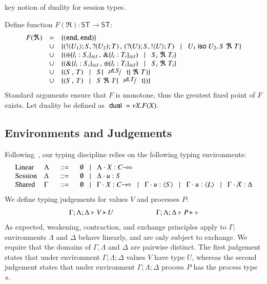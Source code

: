 key notion of duality for session types.
%
\begin{definition}[Duality]\rm
	Define function $F(\Re): \mathsf{ST} \longrightarrow \mathsf{ST}$:
	\[
		\begin{array}{rcl}
			F(\Re) 	&=&	\set{(\tinact, \tinact)}\\
				&\cup&	\set{(\btout{U_1} S, \btinp{U_2} T)\,,\, (\btinp{U} S, \btout{U} T) \bnfbar U_1 \iso U_2, S\ \Re\ T}\\
				&\cup&	\set{(\btsel{l_i: S_i}_{i \in I} \,,\, \btbra{l_i: T_i}_{i \in I}) \bnfbar  S_i\ \Re\ T_i}\\
				&\cup&	\set{(\btbra{l_i: S_i}_{i \in I}\,,\, \btsel{l_i: T_i}_{i \in I}) \bnfbar S_i\ \Re\ T_i}\\
				&\cup&	\set{(S\,,\, T) \bnfbar S\subst{\trec{t}{S}}{\vart{t}}\ \Re\ T)}\\
				&\cup&	\set{(S\,,\, T) \bnfbar S\ \Re\ T\subst{\trec{t}{T}}{\vart{t}})}
		\end{array}
	\]	
	\noi Standard arguments ensure that $F$ is monotone, thus the greatest fixed point
	of $F$ exists. Let duality be defined as $\ \mathsf{dual}\  = \nu X. F(X)$.
\end{definition}
%



\subsection{Environments and Judgements}
%
Following~\cite{tlca07}, 
our typing discipline relies on the following typing environments: %
\[
\begin{array}{llcl}
	\text{Linear}	& \Lambda & \bnfis &	\emptyset \bnfbar \Lambda \cat \varp{X}: \lhot{C}\\
	\text{Session}	& \Delta  & \bnfis &	\emptyset \bnfbar \Delta \cat u:S \\
	\text{Shared}	& \Gamma  & \bnfis &	\emptyset \bnfbar \Gamma \cat \varp{X}: \shot{C} \bnfbar \Gamma \cat u: \chtype{S} \bnfbar
						\Gamma \cat u: \chtype{L} \bnfbar \Gamma \cat \rvar{X}: \Delta
\end{array}
\]
%
\noi We define typing judgements for values $V$
and processes $P$:
%
\[	\begin{array}{c}
		\Gamma; \Lambda; \Delta \vdash V \triangleright U \qquad \qquad \qquad \Gamma; \Lambda; \Delta \vdash P \triangleright \diamond
	\end{array}
\]
%
\noi As expected, weakening, contraction, and exchange principles apply to $\Gamma$;
environments $\Lambda$ and $\Delta$ behave linearly, and are only subject to exchange.
We require that the domains of $\Gamma, \Lambda$ and $\Delta$ are pairwise distinct.
The first judgement states that under environment $\Gamma; \Lambda; \Delta$
values $V$ have type $U$,
whereas the second judgement states that under environment $\Gamma; \Lambda; \Delta$
process $P$ has the process type $\diamond$.

